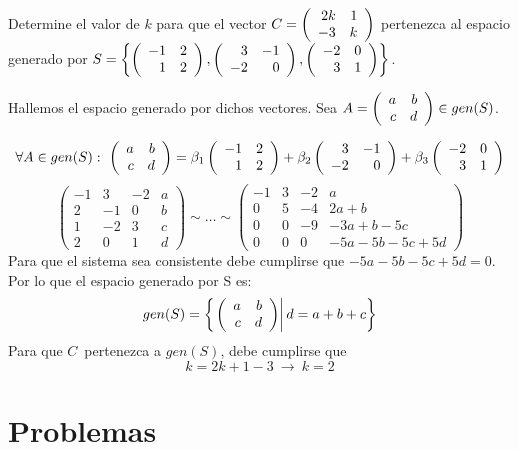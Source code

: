 \begin{ejercicio}
Determine el valor de $k$ para que el vector $C= \left( \begin{array}{rr} 2k&1\\ -3&k \end{array} \right) $ pertenezca al espacio generado por $S=\left\{ \left( \begin{array}{rr} -1&2\\ 1&2 \end{array} \right) ,  \left( \begin{array}{rr} 3&-1\\ -2&0 \end{array} \right) ,  \left( \begin{array}{rr} -2&0\\ 3&1 \end{array} \right) \right\}$.
\end{ejercicio}
Hallemos el espacio generado por dichos vectores. Sea $A= \left( \begin{array}{rr} a&b\\ c&d \end{array} \right)  \in gen(S)$.

\[\forall A\in gen(S):\ 
\matrdxd{a&b}{c&d}=
\beta_1\matrdxd{-1&2}{1&2}+ \beta_2\matrdxd{3&-1}{-2&0}+ \beta_3\matrdxd{-2&0}{3&1}
\]
\[
\left(
\begin{array}{rrr|r}
-1&3&-2&a\\
2&-1&0&b\\
1&-2&3&c\\
2&0&1&d
\end{array}
\right)
\sim
\ldots
\sim
\left(
\begin{array}{rrr|r}
-1&3&-2&a\\
0&5&-4&2a+b\\
0&0&-9&-3a+b-5c\\
0&0&0&-5a-5b-5c+5d
\end{array}
\right)
\]
Para que el sistema sea consistente debe cumplirse que $-5a-5b-5c+5d=0$. Por lo que el espacio generado por S es:
\[gen(S)=\left\{ \left. 
 \left( \begin{array}{rr} a&b\\ c&d \end{array} \right) 
\right| d=a+b+c \right\}
\]
Para que $C$\ pertenezca a $gen(S)$, debe cumplirse que
\[k=2k+1-3\ \rightarrow\ k=2\]


\section{Problemas}

